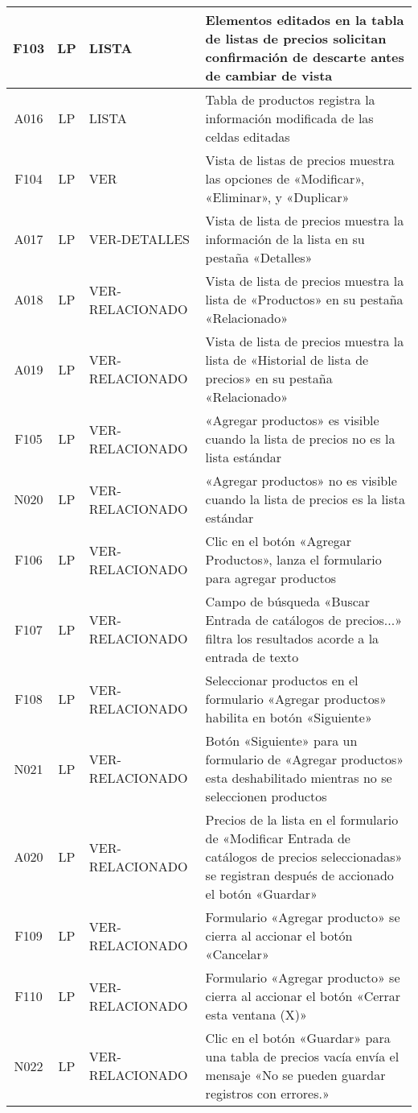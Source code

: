 \begin{landscape}
{\begin{longtable}[htb]{|c|c|p{5.0cm}|p{14.0cm}|}
F103 & LP & LISTA & Elementos editados en la tabla de listas de precios solicitan confirmación de descarte antes de cambiar de vista \\ \hline
A016 & LP & LISTA & Tabla de productos registra la información modificada de las celdas editadas \\ \hline
F104 & LP & VER & Vista de listas de precios muestra las opciones de «Modificar», «Eliminar», y «Duplicar» \\ \hline
A017 & LP & VER-DETALLES & Vista de lista de precios muestra la información de la lista en su pestaña «Detalles» \\ \hline
A018 & LP & VER-RELACIONADO & Vista de lista de precios muestra la lista de «Productos» en su pestaña «Relacionado» \\ \hline
A019 & LP & VER-RELACIONADO & Vista de lista de precios muestra la lista de «Historial de lista de precios» en su pestaña «Relacionado» \\ \hline
F105 & LP & VER-RELACIONADO & «Agregar productos» es visible cuando la lista de precios no es la lista estándar \\ \hline
N020 & LP & VER-RELACIONADO & «Agregar productos» no es visible cuando la lista de precios es la lista estándar \\ \hline
F106 & LP & VER-RELACIONADO & Clic en el botón «Agregar Productos», lanza el formulario para agregar productos \\ \hline
F107 & LP & VER-RELACIONADO & Campo de búsqueda «Buscar Entrada de catálogos de precios...» filtra los resultados acorde a la entrada de texto \\ \hline
F108 & LP & VER-RELACIONADO & Seleccionar productos en el formulario «Agregar productos» habilita en botón «Siguiente» \\ \hline
N021 & LP & VER-RELACIONADO & Botón «Siguiente» para un formulario de «Agregar productos» esta deshabilitado mientras no se seleccionen productos \\ \hline
A020 & LP & VER-RELACIONADO & Precios de la lista en el formulario de «Modificar Entrada de catálogos de precios seleccionadas» se registran después de accionado el botón «Guardar» \\ \hline
F109 & LP & VER-RELACIONADO & Formulario «Agregar producto» se cierra al accionar el botón «Cancelar» \\ \hline
F110 & LP & VER-RELACIONADO & Formulario «Agregar producto» se cierra al accionar el botón «Cerrar esta ventana (X)» \\ \hline
N022 & LP & VER-RELACIONADO & Clic en el botón «Guardar» para una tabla de precios vacía envía el mensaje «No se pueden guardar registros con errores.» \\ \hline

\end{longtable}}
\end{landscape}
